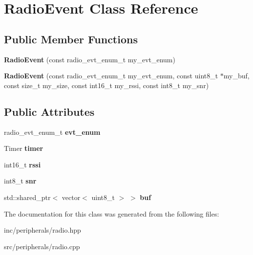 \hypertarget{classRadioEvent}{}\section{Radio\+Event Class Reference}
\label{classRadioEvent}
\subsection*{Public Member Functions}
\begin{DoxyCompactItemize}
\item 
\mbox{\label{classRadioEvent_ac5009701fb085a42373b4c267efb8d33}} 
{\bfseries Radio\+Event} (const radio\+\_\+evt\+\_\+enum\+\_\+t my\+\_\+evt\+\_\+enum)
\item 
\mbox{\label{classRadioEvent_ae3c3bffa072ec757b08b5eecebf499b6}} 
{\bfseries Radio\+Event} (const radio\+\_\+evt\+\_\+enum\+\_\+t my\+\_\+evt\+\_\+enum, const uint8\+\_\+t $\ast$my\+\_\+buf, const size\+\_\+t my\+\_\+size, const int16\+\_\+t my\+\_\+rssi, const int8\+\_\+t my\+\_\+snr)
\end{DoxyCompactItemize}
\subsection*{Public Attributes}
\begin{DoxyCompactItemize}
\item 
\mbox{\label{classRadioEvent_acd3bce088fa993ee9b9428e18f853c0c}} 
radio\+\_\+evt\+\_\+enum\+\_\+t {\bfseries evt\+\_\+enum}
\item 
\mbox{\label{classRadioEvent_a1742dcf568b09260ae75c7e9a13bad6c}} 
Timer {\bfseries timer}
\item 
\mbox{\label{classRadioEvent_a7671d69e29c98d4cf9a854f073b643c9}} 
int16\+\_\+t {\bfseries rssi}
\item 
\mbox{\label{classRadioEvent_a7ff4d5d7c39dbbdad61644704c90c506}} 
int8\+\_\+t {\bfseries snr}
\item 
\mbox{\label{classRadioEvent_a37bc8ae4a09144466d7a98374db5ff32}} 
std\+::shared\+\_\+ptr$<$ vector$<$ uint8\+\_\+t $>$ $>$ {\bfseries buf}
\end{DoxyCompactItemize}


The documentation for this class was generated from the following files\+:\begin{DoxyCompactItemize}
\item 
inc/peripherals/radio.\+hpp\item 
src/peripherals/radio.\+cpp\end{DoxyCompactItemize}

